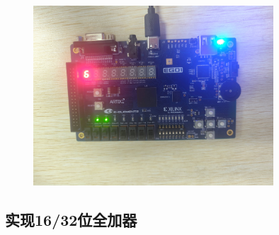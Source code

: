 \documentclass[a4,10pt,zihao=-4]{ctexart}
\begin{document}
\begin{figure}[!h]
\begin{minipage}{0.49\linewidth}
	\end{minipage}
	\begin{minipage}{0.49\linewidth}
		\centering
		\includegraphics[width=0.8\textwidth]{板载结果6.jpg}

	\end{minipage}
\end{figure}


\newpage
\subsection{实现16/32位全加器}
\end{document}
